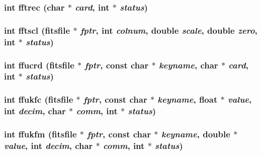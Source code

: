 \subsubsection{\setlength{\rightskip}{0pt plus 5cm}int fftrec (char $\ast$ {\em card}, int $\ast$ {\em status})}\label{fitsio__64_8h_790ab8b814352c996191e4eed875c843}


\subsubsection{\setlength{\rightskip}{0pt plus 5cm}int fftscl (\bf{fitsfile} $\ast$ {\em fptr}, int {\em colnum}, double {\em scale}, double {\em zero}, int $\ast$ {\em status})}\label{fitsio__64_8h_189576cb1cc68cb3339679ea81efa79e}


\subsubsection{\setlength{\rightskip}{0pt plus 5cm}int ffucrd (\bf{fitsfile} $\ast$ {\em fptr}, const char $\ast$ {\em keyname}, char $\ast$ {\em card}, int $\ast$ {\em status})}\label{fitsio__64_8h_e18c3770ab750f65ed969ed243adc779}


\subsubsection{\setlength{\rightskip}{0pt plus 5cm}int ffukfc (\bf{fitsfile} $\ast$ {\em fptr}, const char $\ast$ {\em keyname}, float $\ast$ {\em value}, int {\em decim}, char $\ast$ {\em comm}, int $\ast$ {\em status})}\label{fitsio__64_8h_a327f0515451f35b7ed8e6c31bc92421}


\subsubsection{\setlength{\rightskip}{0pt plus 5cm}int ffukfm (\bf{fitsfile} $\ast$ {\em fptr}, const char $\ast$ {\em keyname}, double $\ast$ {\em value}, int {\em decim}, char $\ast$ {\em comm}, int $\ast$ {\em status})}\label{fitsio__64_8h_c26ad2e4d827639f834233229cf99ccb}


